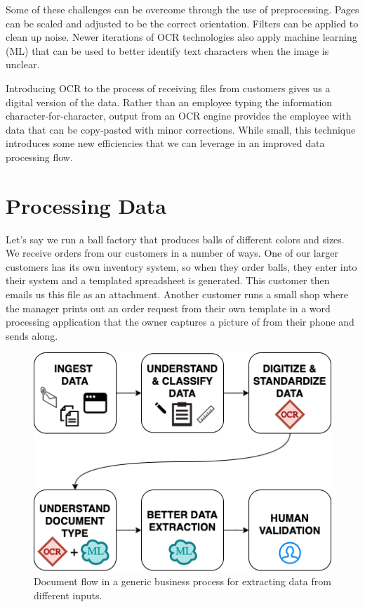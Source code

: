 \documentclass[conference]{IEEEtran}
\begin{document}
Some of these challenges can be overcome through the use of preprocessing. Pages can be scaled and adjusted to be the correct orientation. Filters can be applied to clean up noise. Newer iterations of OCR technologies also apply machine learning (ML) that can be used to better identify text characters when the image is unclear.

Introducing OCR to the process of receiving files from customers gives us a digital version of the data. Rather than an employee typing the information character-for-character, output from an OCR engine provides the employee with data that can be copy-pasted with minor corrections. While small, this technique introduces some new efficiencies that we can leverage in an improved data processing flow.

\section{Processing Data} \label{sectionProcessingData}

Let's say we run a ball factory that produces balls of different colors and sizes. We receive orders from our customers in a number of ways. One of our larger customers has its own inventory system, so when they order balls, they enter into their system and a templated spreadsheet is generated. This customer then emails us this file as an attachment. Another customer runs a small shop where the manager prints out an order request from their own template in a word processing application that the owner captures a picture of from their phone and sends along.

\begin{figure}[ht]
\centerline{\includegraphics[width=\columnwidth]{HighLevelFlow.png}}
\caption{Document flow in a generic business process for extracting data from different inputs.}
\label{figHighLevelFlow}
\end{figure}
\end{document}

